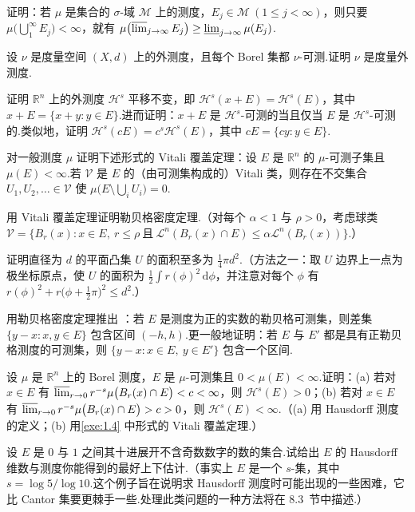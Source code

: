 \begin{exercises}
\item 证明：若 $\mu$ 是集合的 $\sigma$-域 $\mathcal{M}$ 上的测度，$E_j\in\mathcal{M}\ (1\leq j<\infty)$，则只要 $\mu\bigl(\bigcup_{1}^{\infty}E_j\bigr)<\infty$，就有
$\mu\bigl(\varlimsup_{j\to\infty}E_j\bigr)\geq\varliminf_{j\to\infty}\mu(E_j)$.
\item 设 $\nu$ 是度量空间 $(X,d)$ 上的外测度，且每个 Borel 集都 $\nu$-可测.证明 $\nu$ 是度量外测度.
\item 证明 $\mathbb{R}^n$ 上的外测度 $\mathcal{H}^s$ 平移不变，即 $\mathcal{H}^s(x+E)=\mathcal{H}^s(E)$，其中 $x+E=\{x+y:y\in E\}$.进而证明：$x+E$ 是 $\mathcal{H}^s$-可测的当且仅当 $E$ 是 $\mathcal{H}^s$-可测的.类似地，证明 $\mathcal{H}^s(cE)=c^s\mathcal{H}^s(E)$，其中 $cE=\{cy:y\in E\}$.
\item 对一般测度 $\mu$ 证明下述形式的 Vitali 覆盖定理：设 $E$ 是 $\mathbb{R}^n$ 的 $\mu$-可测子集且 $\mu(E)<\infty$.若 $\mathcal{V}$ 是 $E$ 的（由可测集构成的）Vitali 类，则存在不交集合 $U_1,U_2,\ldots\in\mathcal{V}$ 使 $\mu\bigl(E\setminus\bigcup_{i}U_i\bigr)=0$.
\item 用 Vitali 覆盖定理证明勒贝格密度定理.（对每个 $\alpha<1$ 与 $\rho>0$，考虑球类
$\mathcal{V}=\{B_r(x):x\in E,\ r\leq\rho\ \text{且}\ \mathcal{L}^n(B_r(x)\cap E)\leq\alpha\mathcal{L}^n(B_r(x))\}$.）
\item 证明直径为 $d$ 的平面凸集 $U$ 的面积至多为 $\frac{1}{4}\pi d^2$.（方法之一：取 $U$ 边界上一点为极坐标原点，使 $U$ 的面积为 $\frac{1}{2}\int r(\phi)^2\,\mathrm{d}\phi$，并注意对每个 $\phi$ 有 $r(\phi)^2+r\bigl(\phi+\frac{1}{2}\pi\bigr)^2\leq d^2$.）
\item 用勒贝格密度定理推出 ：若 $E$ 是测度为正的实数的勒贝格可测集，则差集 $\{y-x:x,y\in E\}$ 包含区间 $(-h,h)$.更一般地证明：若 $E$ 与 $E'$ 都是具有正勒贝格测度的可测集，则 $\{y-x:x\in E,\ y\in E'\}$ 包含一个区间.
\item 设 $\mu$ 是 $\mathbb{R}^n$ 上的 Borel 测度，$E$ 是 $\mu$-可测集且 $0<\mu(E)<\infty$.证明：(a) 若对 $x\in E$ 有 $\varlimsup_{r\to 0}r^{-s}\mu\bigl(B_r(x)\cap E\bigr)<c<\infty$，则 $\mathcal{H}^s(E)>0$；(b) 若对 $x\in E$ 有 $\varlimsup_{r\to 0}r^{-s}\mu\bigl(B_r(x)\cap E\bigr)>c>0$，则 $\mathcal{H}^s(E)<\infty$.（(a) 用 Hausdorff 测度的定义；(b) 用\cref{exe:1.4} 中形式的 Vitali 覆盖定理.）
\item 设 $E$ 是 $0$ 与 $1$ 之间其十进展开不含奇数数字的数的集合.试给出 $E$ 的 Hausdorff 维数与测度你能得到的最好上下估计.（事实上 $E$ 是一个 $s$-集，其中 $s=\log 5/\log 10$.这个例子旨在说明求 Hausdorff 测度时可能出现的一些困难，它比 Cantor 集要更棘手一些.处理此类问题的一种方法将在 8.3~节中描述.）
\end{exercises}
